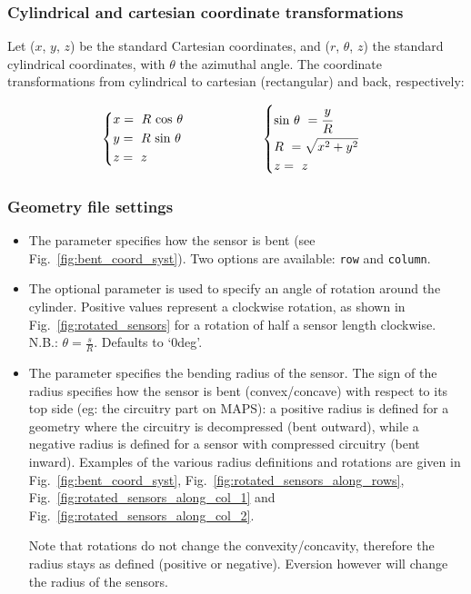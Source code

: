 \subsubsection{Cylindrical and cartesian coordinate transformations}
\label{sssec:cylindrical_coord_transformations}

Let ($x$, $y$, $z$) be the standard Cartesian coordinates, and ($r$, $\theta$, $z$) the standard cylindrical coordinates, with $\theta$ the azimuthal angle. The coordinate transformations from cylindrical to cartesian (rectangular) and back, respectively:

\begin{alignat*}{2}
  & \begin{dcases}
  x = \ R \ \text{cos $\theta$}\\
  y = \ R \ \text{sin $\theta$} \\
  z = \ z
  \end{dcases}
    & \hspace{5em} & \begin{dcases}
  \text{sin} \ \theta \ = \cfrac{y}{R}\\
  R \ = \sqrt{x^2+y^2} \\
  z = \ z
  \end{dcases}
\end{alignat*}



\subsubsection{Geometry file settings}
\label{sssec:cylindrical_coord_system_params}

\begin{itemize}
    \item The  parameter specifies how the sensor is bent (see Fig.~\ref{fig:bent_coord_syst}). Two options are available: \texttt{row} and \texttt{column}. 
    \item The optional  parameter is used to specify an angle of rotation around the cylinder. Positive values represent a clockwise rotation, as shown in Fig.~\ref{fig:rotated_sensors} for a rotation of half a sensor length clockwise. N.B.: $\theta = \frac{s}{R}$. Defaults to `0deg'.
    \item The  parameter specifies the bending radius of the sensor. The sign of the radius specifies how the sensor is bent (convex/concave) with respect to its top side (eg: the circuitry part on MAPS): a positive radius is defined for a geometry where the circuitry is decompressed (bent outward), while a negative radius is defined for a sensor with compressed circuitry (bent inward). Examples of the various radius definitions and rotations are given in Fig.~\ref{fig:bent_coord_syst}, Fig.~\ref{fig:rotated_sensors_along_rows}, Fig.~\ref{fig:rotated_sensors_along_col_1} and Fig.~\ref{fig:rotated_sensors_along_col_2}. 
    
    Note that rotations do not change the convexity/concavity, therefore the radius stays as defined (positive or negative). Eversion however will change the radius of the sensors.
    \end{itemize}
    
